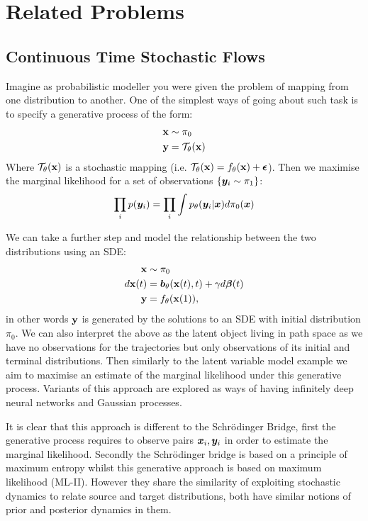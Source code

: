 \documentclass[a4paper,12pt,twoside,openright]{report}
\theoremstyle{definition}
\begin{document}
\chapter{Related Problems}
\section{Continuous Time Stochastic Flows}

Imagine as probabilistic modeller you were given the problem of mapping from one distribution to another. One of the simplest ways of going about such task is to specify a generative process of the form:
\begin{align*}
    {\mathbf{x}} &\sim \pi_0 \\
    {\mathbf{y}} &= {\mathcal{T}}_{\theta}({\mathbf{x}})
\end{align*}
Where ${\mathcal{T}}_{\theta}({\mathbf{x}})$  is a stochastic mapping (i.e. ${\mathcal{T}}_{\theta}({\mathbf{x}}) = f_{\theta}({\mathbf{x}}) + {\bm{\epsilon}}$). Then we maximise the marginal likelihood for a set of observations $\{{\bm{y}}_i \sim \pi_1 \}$:
\begin{align*}
    \prod_i p({\bm{y}}_i) = \prod_i \int p_{\theta}({\bm{y}}_i | {\bm{x}}) d\pi_0({\bm{x}})
\end{align*}

We can take a further step and model the relationship between the two distributions using an SDE:
\begin{align*}
    {\mathbf{x}} &\sim \pi_0 \\
    d{\mathbf{x}}(t) &= {\bm{b}}_{\theta}({\mathbf{x}}(t), t) + \gamma d{\bm{\beta}}(t) \\
    {\mathbf{y}} &= f_{\theta}({\mathbf{x}}(1)),
\end{align*}
in other words ${\mathbf{y}}$ is generated by the solutions to an SDE with initial distribution $\pi_0$. We can also interpret the above as the latent object living in path space as we have no observations for the trajectories  but only observations of its initial and terminal distributions. Then similarly to the latent variable model example we aim to maximise an estimate of the marginal likelihood under this generative process. Variants of this approach are explored \citep{lahdesmakideep, tzen2019neural} as ways of having infinitely deep neural networks and Gaussian processes.

It is clear that this approach is different to the Schrödinger Bridge, first the generative process requires to observe pairs ${\bm{x}}_i, {\bm{y}}_i$ in order to estimate the marginal likelihood. Secondly the Schrödinger bridge is based on a principle of maximum entropy whilst this generative approach is based on maximum likelihood (ML-II).  However they share the similarity of exploiting stochastic dynamics to relate source and target distributions, both have similar notions of prior and posterior dynamics in them.
\end{document}
